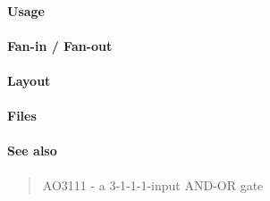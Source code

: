 \paragraph{Usage}

\paragraph{Fan-in / Fan-out}

\paragraph{Layout}

\paragraph{Files}

\paragraph{See also}
\begin{quote}
    AO3111 - a 3-1-1-1-input AND-OR gate
\end{quote}
